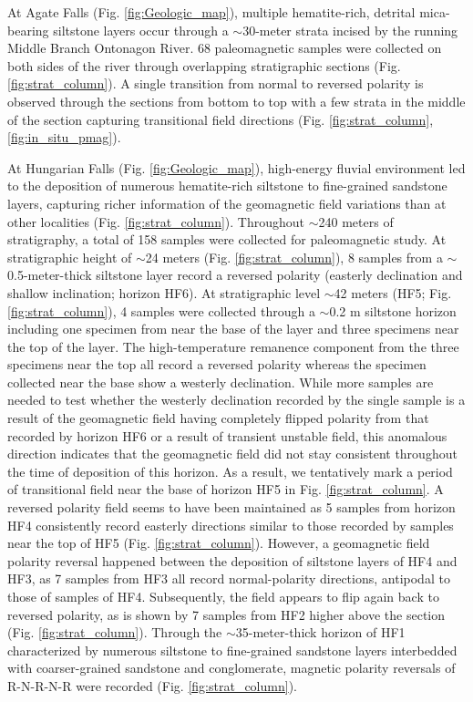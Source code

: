 \documentclass[draft]{agujournal2019}
\begin{document}
At Agate Falls (Fig. \ref{fig:Geologic_map}), multiple hematite-rich, detrital mica-bearing siltstone layers occur through a $\sim$30-meter strata incised by the running Middle Branch Ontonagon River. 68 paleomagnetic samples were collected on both sides of the river through overlapping stratigraphic sections (Fig. \ref{fig:strat_column}). A single transition from normal to reversed polarity is observed through the sections from bottom to top with a few strata in the middle of the section capturing transitional field directions (Fig. \ref{fig:strat_column}, \ref{fig:in_situ_pmag}). 

At Hungarian Falls (Fig. \ref{fig:Geologic_map}), high-energy fluvial environment led to the deposition of numerous hematite-rich siltstone to fine-grained sandstone layers, capturing richer information of the geomagnetic field variations than at other localities (Fig. \ref{fig:strat_column}). Throughout $\sim$240 meters of stratigraphy, a total of 158 samples were collected for paleomagnetic study. At stratigraphic height of $\sim$24 meters (Fig. \ref{fig:strat_column}), 8 samples from a $\sim$0.5-meter-thick siltstone layer record a reversed polarity (easterly declination and shallow inclination; horizon HF6). At stratigraphic level $\sim$42 meters (HF5; Fig. \ref{fig:strat_column}), 4 samples were collected through a $\sim$0.2 m siltstone horizon including one specimen from near the base of the layer and three specimens near the top of the layer. The high-temperature remanence component from the three specimens near the top all record a reversed polarity whereas the specimen collected near the base show a westerly declination. While more samples are needed to test whether the westerly declination recorded by the single sample is a result of the geomagnetic field having completely flipped polarity from that recorded by horizon HF6 or a result of transient unstable field, this anomalous direction indicates that the geomagnetic field did not stay consistent throughout the time of deposition of this horizon. As a result, we tentatively mark a period of transitional field near the base of horizon HF5 in Fig. \ref{fig:strat_column}. A reversed polarity field seems to have been maintained as 5 samples from horizon HF4 consistently record easterly directions similar to those recorded by samples near the top of HF5 (Fig. \ref{fig:strat_column}). However, a geomagnetic field polarity reversal happened between the deposition of siltstone layers of HF4 and HF3, as 7 samples from HF3 all record normal-polarity directions, antipodal to those of samples of HF4. Subsequently, the field appears to flip again back to reversed polarity, as is shown by 7 samples from HF2 higher above the section (Fig. \ref{fig:strat_column}). Through the $\sim$35-meter-thick horizon of HF1 characterized by numerous siltstone to fine-grained sandstone layers interbedded with coarser-grained sandstone and conglomerate, magnetic polarity reversals of R-N-R-N-R were recorded (Fig. \ref{fig:strat_column}). 
\end{document}
